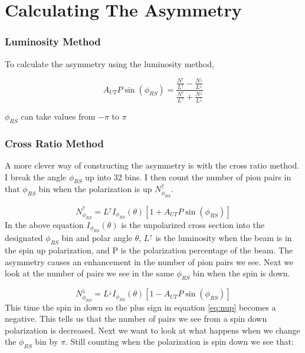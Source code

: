 \documentclass[abstract = on,listof=totoc, bibliography=totoc]{scrreprt}
\begin{document}
\FloatBarrier
\section{Calculating The Asymmetry}




\subsubsection{Luminosity Method}

To calculate the asymmetry using the luminosity method, 

\begin{equation}
A_{UT}P\sin\left(\phi_{RS}\right) = \frac{\frac{N^\uparrow}{L^\uparrow} - \frac{N^\downarrow}{L^\downarrow}} {\frac{N^\uparrow}{L^\uparrow} + \frac{N^\downarrow}{L^\downarrow}}
\end{equation}

$\phi_{RS}$ can take values from $-\pi$ to $\pi$



\subsubsection{Cross Ratio Method}

A more clever way of constructing the asymmetry is with the cross ratio method. I break the angle $\phi_{RS}$ up into 32 bins. I then count the number of pion pairs in that $\phi_{RS}$ bin when the polarization is up $N^\uparrow_{\phi_{RS}}$. 

\begin{equation}
\label{eq:nup}
N^\uparrow_{\phi_{RS}} = L^\uparrow I_{\phi_{RS}}(\theta)\left[1+A_{UT}P\sin(\phi_{RS})\right]
\end{equation}
%
In the above equation $I_{\phi_{RS}}(\theta)$ is the unpolarized cross section into the designated $\phi_{RS}$ bin and polar angle $\theta$, $L^\uparrow$ is the luminosity when the beam is in the spin up polarization, and P is the polarization percentage of the beam. The asymmetry causes an enhancement in the number of pion pairs we see. Next we look at the number of pairs we see in the same $\phi_{RS}$ bin when the spin is down.

\begin{equation}
\label{eq:ndwn}
N^\downarrow_{\phi_{RS}} = L^\downarrow I_{\phi_{RS}}(\theta)\left[1-A_{UT}P\sin(\phi_{RS})\right]
\end{equation}
%
This time the spin in down so the plus sign in equation \ref{eq:nup} becomes a negative. This tells us that the number of pairs we see from a spin down polarization is decreased. 
Next we want to look at what happens when we change the $\phi_{RS}$ bin by $\pi$. Still counting when the polarization is spin down we see that:
\end{document}
